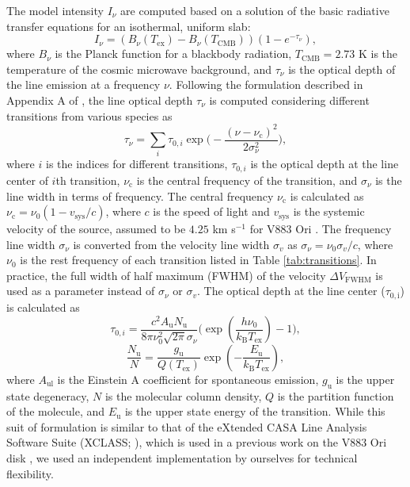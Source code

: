 \documentclass[linenumbers, twocolumn, twocolappendix, astrosymb, times]{aastex631}
\begin{document}
The model intensity $I_\nu$ are computed based on a solution of the basic radiative transfer equations for an isothermal, uniform slab:
\begin{equation}
    I_\nu = (B_\nu(T_\mathrm{ex}) - B_\nu(T_\mathrm{CMB})) (1 - e^{-\tau_\nu}),
\end{equation}
where $B_\nu$ is the Planck function for a blackbody radiation, $T_\mathrm{CMB} = 2.73$ K is the temperature of the cosmic microwave background, and $\tau_\nu$ is the optical depth of the line emission at a frequency $\nu$. Following the formulation described in Appendix A of \citet{Yamato2022}, the line optical depth $\tau_\nu$ is computed considering different transitions from various species as
\begin{equation}
    \tau_\nu = \sum_{i}\tau_{0, i} \exp\bigg(-\frac{(\nu - \nu_\mathrm{c})^2}{2 \sigma_\nu^2}\bigg),
\end{equation}
where $i$ is the indices for different transitions, $\tau_{0, i}$ is the optical depth at the line center of $i$th transition, $\nu_\mathrm{c}$ is the central frequency of the transition, and $\sigma_\nu$ is the line width in terms of frequency. The central frequency $\nu_\mathrm{c}$ is calculated as $\nu_\mathrm{c} = \nu_0 (1 - v_\mathrm{sys}/c)$, where $c$ is the speed of light and $v_\mathrm{sys}$ is the systemic velocity of the source, assumed to be $4.25$ km s$^{-1}$ for V883 Ori \citep{Tobin2023}. The frequency line width $\sigma_\nu$ is converted from the velocity line width $\sigma_v$ as $\sigma_\nu = \nu_0 \sigma_v / c$, where $\nu_0$ is the rest frequency of each transition listed in Table \ref{tab:transitions}. In practice, the full width of half maximum (FWHM) of the velocity $\Delta V_\mathrm{FWHM}$ is used as a parameter instead of $\sigma_\nu$ or $\sigma_v$. The optical depth at the line center ($\tau_\mathrm{0, i}$) is calculated as
\begin{equation}
    \tau_{0, i} = \frac{c^2A_\mathrm{u}N_\mathrm{u}}{8\pi\nu_0^2\sqrt{2\pi}\sigma_\nu}\Bigg(\exp\left(\frac{h\nu_0}{k_\mathrm{B}T_\mathrm{ex}}\right) - 1\Bigg),
\end{equation}
\begin{equation}
    \frac{N_\mathrm{u}}{N} = \frac{g_\mathrm{u}}{Q(T_\mathrm{ex})}\exp\left(-\frac{E_\mathrm{u}}{k_\mathrm{B}T_\mathrm{ex}}\right),
\end{equation}
where $A_\mathrm{ul}$ is the Einstein A coefficient for spontaneous emission, $g_\mathrm{u}$ is the upper state degeneracy, $N$ is the molecular column density, $Q$ is the partition function of the molecule, and $E_\mathrm{u}$ is the upper state energy of the transition. While this suit of formulation is similar to that of the eXtended CASA Line Analysis Software Suite (XCLASS; \citealt{Moller2017}), which is used in a previous work on the V883 Ori disk \citep{Lee2019}, we used an independent implementation by ourselves for technical flexibility.
\end{document}
